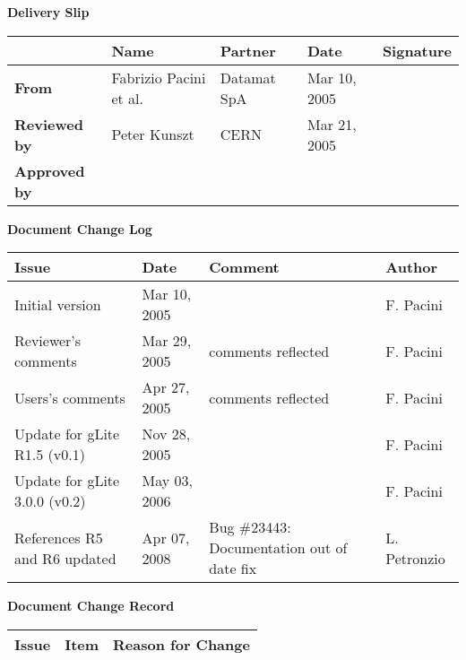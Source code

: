 \begin{center}
{\bf Delivery Slip}
\end{center}
\begin{tabularx}{\textwidth}{|l|l|l|X|X|}
\hline
           & {\bf Name} & {\bf Partner} & {\bf Date} & {\bf Signature} \\
\hline
{\bf From} & Fabrizio Pacini et al. & Datamat SpA & Mar 10, 2005& \\
\hline
{\bf Reviewed by} & Peter Kunszt & CERN & Mar 21, 2005& \\

\hline
{\bf Approved by} & & & & \\
\hline
\end{tabularx}

\begin{center}
{\bf Document Change Log}
\end{center}

\begin{tabularx}{\textwidth}{|l|l|X|X|}
\hline
{\bf Issue } & {\bf Date  } & {\bf Comment } & {\bf Author  } \\   \hline
Initial version & Mar 10, 2005 & & F. Pacini \\ \hline
Reviewer's comments & Mar 29, 2005 & comments reflected & F. Pacini \\
\hline
Users's comments & Apr 27, 2005 & comments reflected & F. Pacini \\
\hline
Update for gLite R1.5 (v0.1) & Nov 28, 2005 & & F. Pacini \\
\hline
Update for gLite 3.0.0 (v0.2) & May 03, 2006 & & F. Pacini \\
\hline
References R5 and R6 updated & Apr 07, 2008 & Bug \#23443: Documentation out of date fix & L. Petronzio \\
\hline
\end{tabularx}

\begin{center}
{\bf Document Change Record}
\end{center}

\begin{tabularx}{\textwidth}{|l|l|X|}
\hline
{\bf Issue } & {\bf Item  } & {\bf Reason for Change } \\   \hline

\hline
\end{tabularx}



